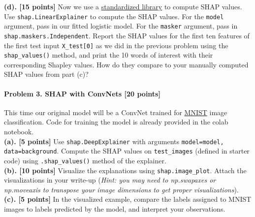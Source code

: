 \textbf{(d). [15 points]} Now we use a \href{https://shap-lrjball.readthedocs.io/en/latest/index.html}{standardized library} to compute SHAP values. Use \verb|shap.LinearExplainer| to compute the SHAP values. For the \verb|model| argument, pass in our fitted logistic model. For the \verb|masker| argument, pass in \verb|shap.maskers.Independent|. 
Report the SHAP values for the first ten features of the first test input \verb|X_test[0]| as we did in the previous problem using the \verb|shap_values()| method, and print the 10 words of interest with their corresponding Shapley values. How do they compare to your manually computed SHAP values from part (c)? 



\paragraph{Problem 3. SHAP with ConvNets [20 points]} This time our original model will be a ConvNet trained for \href{https://en.wikipedia.org/wiki/MNIST_database}{MNIST} image classification. Code for training the model is already provided in the colab notebook. \\

\textbf{(a). [5 points]} 
Use \verb|shap.DeepExplainer| with arguments \verb|model=model, data=background|. Compute the SHAP values on \verb|test_images| (defined in starter code) using \verb|.shap_values()| method of the explainer.\\

\textbf{(b). [10 points]} 
Visualize the explanations using \verb|shap.image_plot|. Attach the visualizations in your write-up (\emph{Hint: you may need to np.swapaxes or np.moveaxis to transpose your image dimensions to get proper visualizations}). \\

\textbf{(c). [5 points]} In the visualized example, compare the labels assigned to MNIST images to labels predicted by the model, and interpret your observations.
